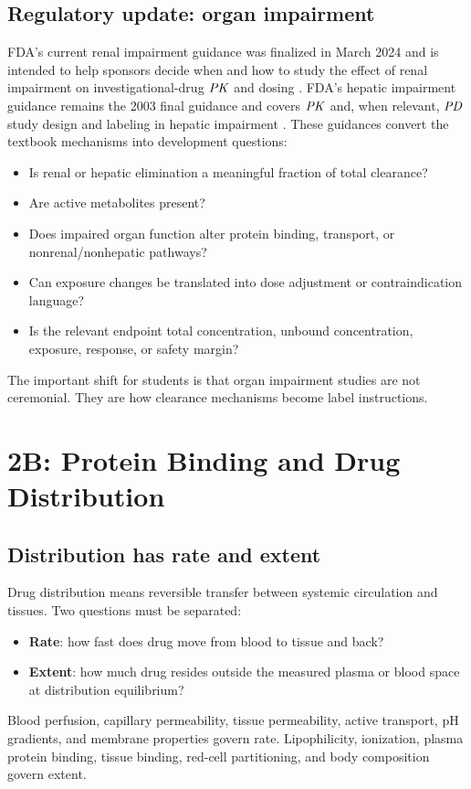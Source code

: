 \documentclass[a4paper]{article}
\newcommand{\PK}{\ensuremath{\pksym{PK}}}
\newcommand{\PD}{\ensuremath{\pksym{PD}}}
\begin{document}
\subsection{Regulatory update: organ impairment}

FDA's current renal impairment guidance was finalized in March 2024 and is intended to help sponsors decide when and how to study the effect of renal impairment on investigational-drug \PK{} and dosing \cite{fda2024renalImpairment}. FDA's hepatic impairment guidance remains the 2003 final guidance and covers \PK{} and, when relevant, \PD{} study design and labeling in hepatic impairment \cite{fda2003hepaticImpairment}. These guidances convert the textbook mechanisms into development questions:
\begin{itemize}[leftmargin=2em]
  \item Is renal or hepatic elimination a meaningful fraction of total clearance?
  \item Are active metabolites present?
  \item Does impaired organ function alter protein binding, transport, or nonrenal/nonhepatic pathways?
  \item Can exposure changes be translated into dose adjustment or contraindication language?
  \item Is the relevant endpoint total concentration, unbound concentration, exposure, response, or safety margin?
\end{itemize}
The important shift for students is that organ impairment studies are not ceremonial. They are how clearance mechanisms become label instructions.

\section{2B: Protein Binding and Drug Distribution}

\subsection{Distribution has rate and extent}

Drug distribution means reversible transfer between systemic circulation and tissues. Two questions must be separated:
\begin{itemize}[leftmargin=2em]
  \item \textbf{Rate}: how fast does drug move from blood to tissue and back?
  \item \textbf{Extent}: how much drug resides outside the measured plasma or blood space at distribution equilibrium?
\end{itemize}
Blood perfusion, capillary permeability, tissue permeability, active transport, pH gradients, and membrane properties govern rate. Lipophilicity, ionization, plasma protein binding, tissue binding, red-cell partitioning, and body composition govern extent.
\end{document}
